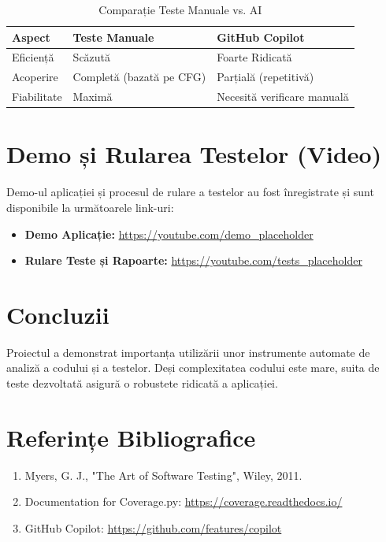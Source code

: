 \documentclass[12pt,a4paper]{article}
\begin{document}
\begin{table}[H]
\centering
\caption{Comparație Teste Manuale vs. AI}
\label{tab:ai-comparison}
\begin{tabular}{|l|p{5cm}|p{5cm}|}
\hline
\textbf{Aspect} & \textbf{Teste Manuale} & \textbf{GitHub Copilot} \\ \hline
Eficiență & Scăzută & Foarte Ridicată \\ \hline
Acoperire & Completă (bazată pe CFG) & Parțială (repetitivă) \\ \hline
Fiabilitate & Maximă & Necesită verificare manuală \\ \hline
\end{tabular}
\end{table}

\section{Demo și Rularea Testelor (Video)}
Demo-ul aplicației și procesul de rulare a testelor au fost înregistrate și sunt disponibile la următoarele link-uri:
\begin{itemize}
    \item \textbf{Demo Aplicație:} \url{https://youtube.com/demo_placeholder}
    \item \textbf{Rulare Teste și Rapoarte:} \url{https://youtube.com/tests_placeholder}
\end{itemize}

\section{Concluzii}
Proiectul a demonstrat importanța utilizării unor instrumente automate de analiză a codului și a testelor. Deși complexitatea codului este mare, suita de teste dezvoltată asigură o robustete ridicată a aplicației.

\section{Referințe Bibliografice}
\begin{enumerate}
    \item Myers, G. J., "The Art of Software Testing", Wiley, 2011.
    \item Documentation for Coverage.py: \url{https://coverage.readthedocs.io/}
    \item GitHub Copilot: \url{https://github.com/features/copilot}
\end{enumerate}
\end{document}

